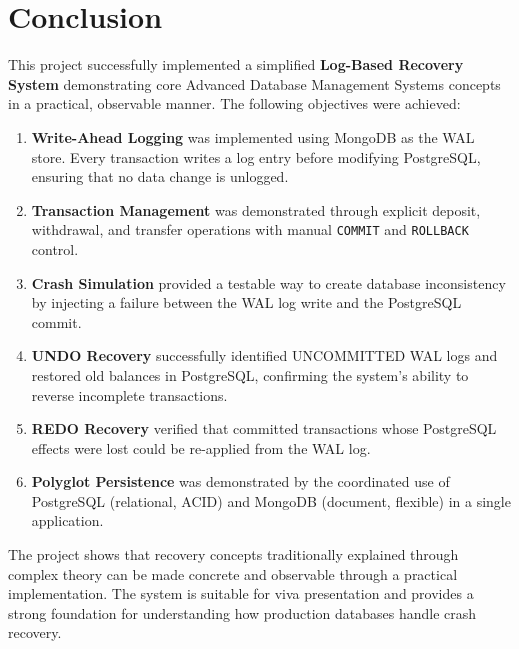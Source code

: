 
\chapter{Conclusion}

This project successfully implemented a simplified \textbf{Log-Based Recovery
System} demonstrating core Advanced Database Management Systems concepts in a
practical, observable manner. The following objectives were achieved:

\begin{enumerate}
  \item \textbf{Write-Ahead Logging} was implemented using MongoDB as the
        WAL store. Every transaction writes a log entry before modifying
        PostgreSQL, ensuring that no data change is unlogged.

  \item \textbf{Transaction Management} was demonstrated through explicit
        deposit, withdrawal, and transfer operations with manual
        \texttt{COMMIT} and \texttt{ROLLBACK} control.

  \item \textbf{Crash Simulation} provided a testable way to create
        database inconsistency by injecting a failure between the WAL log
        write and the PostgreSQL commit.

  \item \textbf{UNDO Recovery} successfully identified UNCOMMITTED WAL
        logs and restored old balances in PostgreSQL, confirming the
        system's ability to reverse incomplete transactions.

  \item \textbf{REDO Recovery} verified that committed transactions whose
        PostgreSQL effects were lost could be re-applied from the WAL log.

  \item \textbf{Polyglot Persistence} was demonstrated by the coordinated
        use of PostgreSQL (relational, ACID) and MongoDB (document, flexible)
        in a single application.
\end{enumerate}

The project shows that recovery concepts traditionally explained through
complex theory can be made concrete and observable through a practical
implementation. The system is suitable for viva presentation and provides
a strong foundation for understanding how production databases handle
crash recovery.

